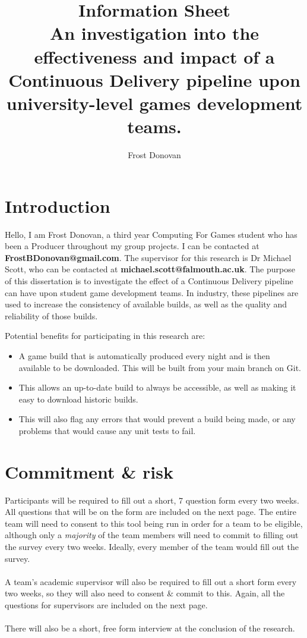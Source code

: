 \documentclass{article}
\begin{document}
    \title{Information Sheet \\
    An investigation into the effectiveness and impact of a Continuous Delivery pipeline upon university-level games development teams.}
    \author{Frost Donovan}

    \maketitle

    \section{Introduction}
        Hello, I am Frost Donovan, a third year Computing For Games student who has been a Producer throughout my group projects. I can be contacted at \textbf{FrostBDonovan@gmail.com}. The supervisor for this research is Dr Michael Scott, who can be contacted at \textbf{michael.scott@falmouth.ac.uk}.
        The purpose of this dissertation is to investigate the effect of a Continuous Delivery pipeline can have upon student game development teams. In industry, these pipelines are used to increase the consistency of available builds, as well as the quality and reliability of those builds. 

        Potential benefits for participating in this research are:
        \begin{itemize}
            \item A game build that is automatically produced every night and is then available to be downloaded. This will be built from your main branch on Git.
            \item This allows an up-to-date build to always be accessible, as well as making it easy to download historic builds.
            \item This will also flag any errors that would prevent a build being made, or any problems that would cause any unit tests to fail. 
        \end{itemize}

    \section{Commitment \& risk}
        Participants will be required to fill out a short, 7 question form every two weeks. All questions that will be on the form are included on the next page.
        The entire team will need to consent to this tool being run in order for a team to be eligible, although only a \textit{majority} of the team members will need to commit to filling out the survey every two weeks. Ideally, every member of the team would fill out the survey. 
        \\ \\
        A team's academic supervisor will also be required to fill out a short form every two weeks, so they will also need to consent \& commit to this. Again, all the questions for supervisors are included on the next page. 
        \\ \\
        There will also be a short, free form interview at the conclusion of the research.
        
\end{document}
